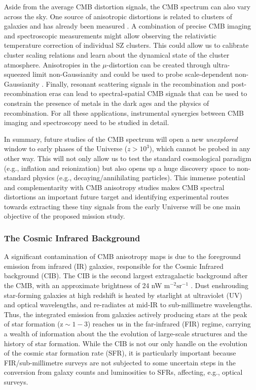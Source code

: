 Aside from the average CMB distortion signals, the CMB spectrum can also vary across the sky. One source of anisotropic distortions is related to clusters of galaxies and has already been measured \citep{Planck2013SZ}. A combination of precise CMB imaging and spectroscopic measurements might allow observing the relativistic temperature correction  \citep{Sazonov1998, Itoh98, Challinor98} of individual SZ clusters. This could allow us to calibrate cluster scaling relations and learn about the dynamical state of the cluster atmosphere. Anisotropies in the $\mu$-distortion can be created through ultra-squeezed limit non-Gaussianity \citep{Pajer2012, Ganc2012} and could be used to probe scale-dependent non-Gaussianity \citep{Biagetti2013, Razi2015}. Finally, resonant scattering signals in the recombination \citep{Jose2005, Carlos2007Pol, Lewis2013} and post-recombination eras \citep{Kaustuv2004, Schleicher2008} can lead to spectral-spatial CMB signals that can be used to constrain the presence of metals in the dark ages and the physics of recombination. For all these applications, instrumental synergies between CMB imaging and spectroscopy need to be studied in detail. 


In summary, future studies of the CMB spectrum will open a new {\it unexplored} window to early phases of the Universe ($z > 10^3$), which cannot be probed in any other way. This will not only allow us to test the standard cosmological paradigm (e.g., inflation and reionization) but also opens up a huge discovery space to non-standard physics (e.g., decaying/annihilating particles). This immense potential and complementarity with CMB anisotropy studies makes CMB spectral distortions an important future target and identifying experimental routes towards extracting these tiny signals from the early Universe will be one main objective of the proposed mission study.

\vspace{-0.15in}
\subsubsection{The Cosmic Infrared Background}
\vspace{-0.05in}
A significant contamination of CMB anisotropy maps is due to
the foreground emission from infrared (IR)
galaxies, responsible for the Cosmic Infrared background (CIB).
The CIB is the second largest
extragalactic background after the CMB, with an approximate
brightness of 24 nW m$\mathrm{^{-2} sr^{-1}}$ \citep{dole2006}.
Dust enshrouding star-forming galaxies at high redshift
is heated by starlight at ultraviolet (UV) and optical wavelengths,
and re-radiates at mid-IR to sub-millimetre wavelengths.
Thus, the integrated emission from galaxies actively
producing stars at the peak of star formation
($\mathrm{z\sim 1-3}$) reaches us in the far-infrared (FIR) regime,
carrying a wealth of information about the the evolution of
large-scale structures and the history of star formation.
While the CIB is not our only handle on the evolution of the
cosmic star formation rate (SFR), it is particularly important
because FIR/sub-millimetre surveys are not subjected to some
uncertain steps in the conversion from galaxy counts and luminosities to SFRs,
affecting, e.g., optical surveys.

